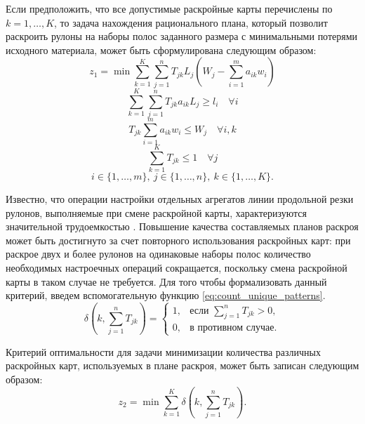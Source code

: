 \documentclass[12pt]{article}
\begin{document}
Если предположить, что все допустимые раскройные карты перечислены по 
$k=1,\ldots,K$, то задача нахождения рационального плана, который позволит 
раскроить рулоны на наборы полос заданного размера с минимальными потерями 
исходного материала, может быть сформулирована следующим образом:
\begin{equation}\label{eq:min_trim_loss}
    z_1=\min{\sum_{k=1}^{K} \sum_{j=1}^{n} T_{jk} L_j 
        \left(W_j-\sum_{i=1}^{m} a_{ik}w_i\right)}
\end{equation}
\begin{equation}\label{eq:orders_are_meet}
     \sum_{k=1}^{K} \sum_{j=1}^{n} T_{jk} a_{ik} L_j \geq l_i \quad \forall i
\end{equation}
\begin{equation}\label{eq:pattern_feasible}
     T_{jk} \sum_{i=1}^{m} a_{ik} w_i \leq W_j \quad \forall i,k
\end{equation}
\begin{equation}\label{eq:rolls_cut_once}
     \sum_{k=1}^{K} T_{jk} \leq 1 \quad \forall j
\end{equation}
\[ i \in \{1,\ldots,m\}, \: j \in \{1,\ldots,n\}, \: k \in \{1,\ldots,K\}.\]

Известно, что операции настройки отдельных агрегатов линии продольной резки 
рулонов, выполняемые при смене раскройной карты, характеризуются значительной 
трудоемкостью \cite{haessler88, song06}. Повышение качества составляемых планов раскроя может 
быть достигнуто за счет повторного использования раскройных карт: при раскрое 
двух и более рулонов на одинаковые наборы полос количество необходимых 
настроечных операций сокращается, поскольку смена раскройной карты в таком 
случае не требуется. Для того чтобы формализовать данный критерий, введем 
вспомогательную функцию 
\eqref{eq:count_unique_patterns}.
\begin{equation}\label{eq:count_unique_patterns}
    \delta\left(k, \sum_{j=1}^{n} T_{jk}\right)=
        \begin{cases}
            1, & \text{если } \sum_{j=1}^{n} T_{jk}>0, \\
            0, & \text{в противном случае}.
        \end{cases}    
\end{equation}

Критерий оптимальности для задачи минимизации количества различных раскройных 
карт, используемых в плане раскроя, может быть записан следующим образом:
\begin{equation}\label{eq:min_patterns}
    z_2=\min{\sum_{k=1}^{K}} \delta\left(k, \sum_{j=1}^{n} T_{jk}\right).
\end{equation}
\end{document}
